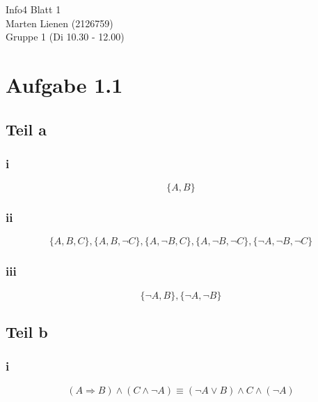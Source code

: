 \documentclass[10pt,a4paper]{article}
\begin{document}
Info4 Blatt 1\\
Marten Lienen (2126759)\\
Gruppe 1 (Di 10.30 - 12.00)\\

\section{Aufgabe 1.1}

\subsection{Teil a}

\subsubsection{i}

\begin{equation}
  \{A, B\}
\end{equation}

\subsubsection{ii}

\begin{equation}
  \{A, B, C\}, \{A, B, \neg C\}, \{A, \neg B, C\}, \{A, \neg B, \neg C\}, \{\neg A, \neg B, \neg C\}
\end{equation}

\subsubsection{iii}

\begin{equation}
  \{\neg A, B\}, \{ \neg A, \neg B \}
\end{equation}

\subsection{Teil b}

\subsubsection{i}

\begin{equation}
  (A \Rightarrow B) \land (C \land \neg A) \equiv (\neg A \lor B) \land C \land (\neg A)
\end{equation}
\end{document}
